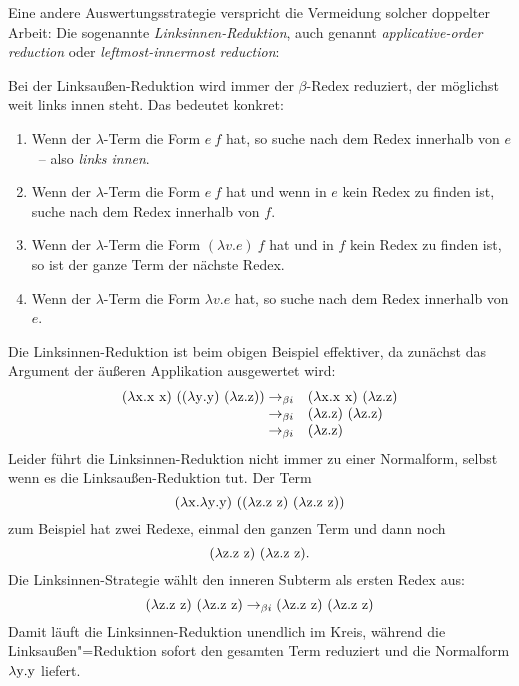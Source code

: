 Eine andere Auswertungsstrategie verspricht die Vermeidung
solcher doppelter Arbeit:  Die sogenannte \textit{Linksinnen-Reduktion},
auch genannt \emph{applicative-order reduction} oder
\emph{leftmost-innermost reduction}:
%
\begin{definition}
  Bei der Linksaußen-Reduktion wird immer der $\beta$-Redex reduziert,
  der möglichst weit links innen steht.  Das bedeutet konkret:
  \begin{enumerate}
  \item Wenn der $\lambda$-Term die Form $e~f$ hat, so suche nach dem Redex innerhalb
    von $e$~-- also \emph{links innen}.
  \item Wenn der $\lambda$-Term die Form $e~f$ hat und wenn in $e$ kein Redex zu finden
    ist, suche nach dem Redex innerhalb von $f$.
  \item Wenn der $\lambda$-Term die Form $(\lambda v.e)~f$ hat und in
    $f$ kein Redex zu finden ist, so
    ist der ganze Term der nächste Redex.
  \item Wenn der $\lambda$-Term die Form $\lambda v.e$ hat, so suche
    nach dem Redex innerhalb von $e$.
  \end{enumerate}
\end{definition}
%
Die Linksinnen-Reduktion ist beim obigen Beispiel effektiver, da
zunächst das Argument der äußeren Applikation ausgewertet wird:
%
\begin{displaymath}
  \begin{array}{rl}
  (\lambda \mathrm x.\mathrm x~\mathrm x)~((\lambda \mathrm y.\mathrm y)~(\lambda \mathrm z.\mathrm z))
  \rightarrow_{\beta i} & 
  (\lambda \mathrm x.\mathrm x~\mathrm x)~(\lambda \mathrm z.\mathrm z)
  \\
  \rightarrow_{\beta i} & 
  (\lambda \mathrm z.\mathrm z)~(\lambda \mathrm z.\mathrm z)
  \\
  \rightarrow_{\beta i} & 
  (\lambda \mathrm z.\mathrm z)
\end{array}
\end{displaymath}
%
Leider führt die Linksinnen-Reduktion nicht immer zu einer Normalform,
selbst wenn es die Linksaußen-Reduktion tut.  Der Term
\[ (\lambda \mathrm x.\lambda \mathrm y.\mathrm y)~((\lambda \mathrm z.\mathrm z~\mathrm z)~(\lambda \mathrm z.\mathrm z~\mathrm z)) \]
zum Beispiel hat zwei Redexe, einmal den ganzen Term und dann noch
\[(\lambda \mathrm z.\mathrm z~\mathrm z)~(\lambda \mathrm z.\mathrm z~\mathrm z).\]  Die Linksinnen-Strategie wählt
den inneren Subterm als ersten Redex aus:
%
\begin{displaymath}
  (\lambda \mathrm z.\mathrm z~\mathrm z)~(\lambda \mathrm z.\mathrm z~\mathrm z)
\rightarrow_{\beta i}
  (\lambda \mathrm z.\mathrm z~\mathrm z)~(\lambda \mathrm z.\mathrm z~\mathrm z)
\end{displaymath}
%
Damit läuft die Linksinnen-Reduktion unendlich im Kreis, während
die Linksaußen"=Reduktion sofort den gesamten Term reduziert und die
Normalform $\lambda \mathrm y.\mathrm y$ liefert.

